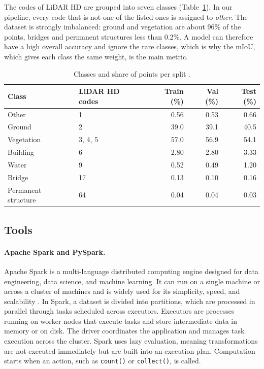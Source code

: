 \documentclass[a4paper, 11pt]{article} %
\begin{document}
The codes of LiDAR HD are grouped into seven classes (Table~\ref{tab:classes}). In our pipeline, every code that is not one of the listed ones is assigned to \textit{other}. The dataset is strongly imbalanced: ground and vegetation are about 96\% of the points, bridges and permanent structures less than 0.2\%. A model can therefore have a high overall accuracy and ignore the rare classes, which is why the mIoU, which gives each class the same weight, is the main metric.

\begin{table}[H]
\centering
\begin{tabular}{llrrr}
\hline
Class & LiDAR HD codes & Train (\%) & Val (\%) & Test (\%) \\
\hline
Other               & 1       & 0.56  & 0.53  & 0.66  \\
Ground              & 2       & 39.0  & 39.1  & 40.5  \\
Vegetation          & 3, 4, 5 & 57.0  & 56.9  & 54.1  \\
Building            & 6       & 2.80  & 2.80  & 3.33  \\
Water               & 9       & 0.52  & 0.49  & 1.20  \\
Bridge              & 17      & 0.13  & 0.10  & 0.16  \\
Permanent structure & 64      & 0.04  & 0.04  & 0.03  \\
\hline
\end{tabular}
\caption{Classes and share of points per split \cite{gaydon2024fractal}.}
\label{tab:classes}
\end{table}

\subsection{Tools}
\paragraph{Apache Spark and PySpark.}
Apache Spark is a multi-language distributed computing engine designed for data engineering, data science, and machine learning. It can run on a single machine or across a cluster of machines and is widely used for its simplicity, speed, and scalability \cite{zaharia2016spark, spark2024docs}. In Spark, a dataset is divided into partitions, which are processed in parallel through tasks scheduled across executors. Executors are processes running on worker nodes that execute tasks and store intermediate data in memory or on disk. The driver coordinates the application and manages task execution across the cluster. Spark uses lazy evaluation, meaning transformations are not executed immediately but are built into an execution plan. Computation starts when an action, such as \texttt{count()} or \texttt{collect()}, is called.
\end{document}
